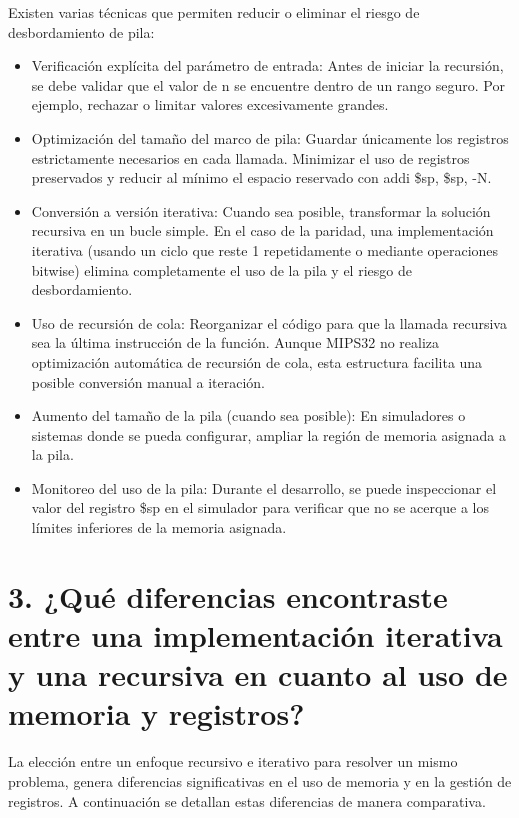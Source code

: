 \documentclass[12pt, letterpaper]{article}
\begin{document}
Existen varias técnicas que permiten reducir o eliminar el riesgo de desbordamiento de pila:

\begin{itemize}
    \item Verificación explícita del parámetro de entrada: Antes de iniciar la recursión, se debe validar que el valor de n se encuentre dentro de un rango seguro. Por ejemplo, rechazar o limitar valores excesivamente grandes.

    \item Optimización del tamaño del marco de pila: Guardar únicamente los registros estrictamente necesarios en cada llamada. Minimizar el uso de registros preservados y reducir al mínimo el espacio reservado con addi \$sp, \$sp, -N.

    \item Conversión a versión iterativa: Cuando sea posible, transformar la solución recursiva en un bucle simple. En el caso de la paridad, una implementación iterativa (usando un ciclo que reste 1 repetidamente o mediante operaciones bitwise) elimina completamente el uso de la pila y el riesgo de desbordamiento.

    \item Uso de recursión de cola: Reorganizar el código para que la llamada recursiva sea la última instrucción de la función. Aunque MIPS32 no realiza optimización automática de recursión de cola, esta estructura facilita una posible conversión manual a iteración.

    \item Aumento del tamaño de la pila (cuando sea posible): En simuladores o sistemas donde se pueda configurar, ampliar la región de memoria asignada a la pila.

    \item Monitoreo del uso de la pila: Durante el desarrollo, se puede inspeccionar el valor del registro \$sp en el simulador para verificar que no se acerque a los límites inferiores de la memoria asignada.
\end{itemize}

\newpage
\section*{3. ¿Qué diferencias encontraste entre una implementación iterativa y una recursiva en cuanto al uso de memoria y registros?}

La elección entre un enfoque recursivo e iterativo para resolver un mismo problema, genera diferencias significativas en el uso de memoria y en la gestión de registros. A continuación se detallan estas diferencias de manera comparativa.
\end{document}
